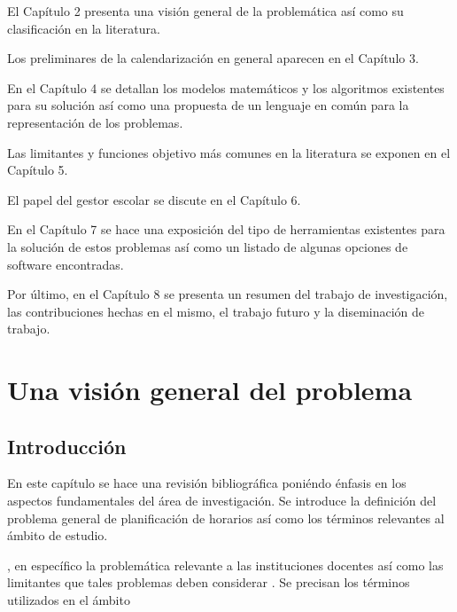 \documentclass[draft,12pt,headsepline,footsepline,paper=letter]{scrreprt}
\begin{document}
El Capítulo 2 presenta una visión general de la problemática así como su clasificación en la literatura.

Los preliminares de la calendarización en general aparecen en el Capítulo 3.

En el Capítulo 4 se detallan los modelos matemáticos y los algoritmos existentes para su solución así como una propuesta de un lenguaje en común para la representación de los problemas.

Las limitantes y funciones objetivo más comunes en la literatura se exponen en el Capítulo 5.

El papel del gestor escolar se discute en el Capítulo 6.

En el Capítulo 7 se hace una exposición del tipo de herramientas existentes para la solución de estos problemas así como un listado de algunas opciones de software encontradas.

Por último, en el Capítulo 8 se presenta un resumen del trabajo de investigación, las contribuciones hechas en el mismo, el trabajo futuro y la diseminación de trabajo.

\chapter{Una visión general del problema}

\section{Introducción}

En este capítulo se hace una revisión bibliográfica poniéndo énfasis en los aspectos fundamentales del área de investigación. Se introduce la definición del problema general de planificación de horarios así como los términos relevantes al ámbito de estudio. 

, en específico la problemática relevante a las instituciones docentes así como las limitantes que tales problemas deben considerar \citep[p.~8]{abdullah06heuristic-approaches}. Se precisan los términos utilizados en el ámbito
\end{document}
